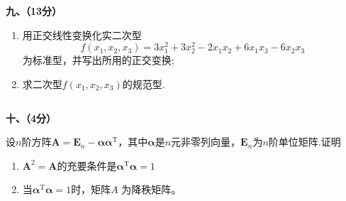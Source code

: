 \documentclass[11pt,a4paper]{ctexart}
\def\t{^\mathrm{T}}
\begin{document}
\begin{framed}
    \begin{large}
        \noindent\textbf{九、（13分）}
    \end{large}
    \begin{enumerate}
        \item 用正交线性变换化实二次型\[f(x_1, x_2, x_3) = 3x_1^2 + 3x_2^2 - 2x_1x_2 + 6x_1x_3 - 6 x_2x_3\]为标准型，并写出所用的正交变换;
        \item 求二次型\(f(x_1, x_2, x_3)\)的规范型.
    \end{enumerate}\[\] \[\]\[\]\[\]\[\]\[\]\[\]\[\]\[\]

    \begin{large}
        \noindent\textbf{十、（4分）}
    \end{large}设\(n\)阶方阵\(\boldsymbol{A} = \boldsymbol{E}_n - \boldsymbol{\alpha\alpha} \t\)，其中\(\boldsymbol{\alpha}\)是\(n\)元非零列向量，\(\boldsymbol{E}_n\)为\(n\)阶单位矩阵.证明\begin{enumerate}
        \item \(\boldsymbol{A}^2 = \boldsymbol{A}\)的充要条件是\(\boldsymbol{\alpha}\t \boldsymbol{\alpha} = 1\)
        \item 当\(\boldsymbol{\alpha}\t \boldsymbol{\alpha} = 1\)时，矩阵\(A\)  为降秩矩阵。
    \end{enumerate}\[\] \[\]\[\]\[\]\[\]\[\]\[\]\[\]\[\]


    \end{framed}
  
\end{document}

